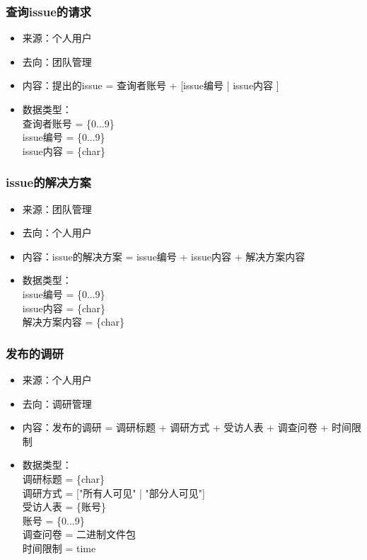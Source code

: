             \subsubsection{\color{red} 查询issue的请求}
            \begin{itemize}
                \item 来源：个人用户
                \item 去向：团队管理
                \item 内容：提出的issue = 查询者账号 + [issue编号 | issue内容 ]
                \item 数据类型：\\
                    查询者账号 = \{0...9\}\\
                    issue编号 = \{0...9\}\\
                    issue内容 = \{char\}\\
            \end{itemize}
            \subsubsection{\color{red} issue的解决方案}
            \begin{itemize}
                \item 来源：团队管理
                \item 去向：个人用户
                \item 内容：issue的解决方案 = issue编号 + issue内容 + 解决方案内容
                \item 数据类型：\\
                    issue编号 = \{0...9\}\\
                    issue内容 = \{char\}\\
                    解决方案内容 = \{char\}\\
            \end{itemize}
            \subsubsection{\color{red} 发布的调研}
            \begin{itemize}
                \item 来源：个人用户
                \item 去向：调研管理
                \item 内容：发布的调研 = 调研标题 + 调研方式 + {受访人表} + 调查问卷 + 时间限制
                \item 数据类型：\\
                    调研标题 = \{char\}\\
                    调研方式 = ["所有人可见" | "部分人可见"] \\
                    受访人表 = \{账号\}\\
                    账号 = \{0...9\}\\
                    调查问卷 = 二进制文件包 \\
                    时间限制 = time \\
            \end{itemize}
